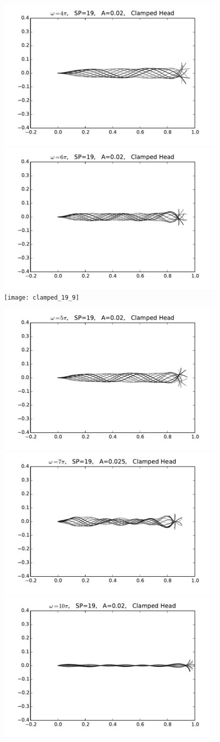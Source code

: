 \documentclass[12pt]{article}
\begin{document}
\begin{figure}
  \includegraphics[width=.3\textwidth]{clamped_19_4}
  \hfill
  \includegraphics[width=.3\textwidth]{clamped_19_6}
  \hfill
  \texttt{[image: clamped\_19\_9]}



  \includegraphics[width=.3\textwidth]{clamped_19_5}
  \hfill
  \includegraphics[width=.3\textwidth]{clamped_19_7}
  \hfill
  \includegraphics[width=.3\textwidth]{clamped_19_10}
  \label{fig:clamped-head}
\end{figure}
\end{document}
